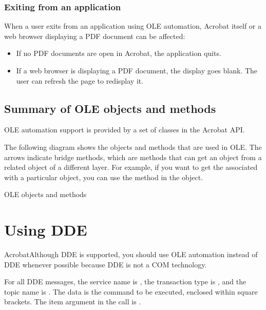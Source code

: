 \documentclass[letterpaper,12pt,english,openany,oneside]{sphinxmanual}
\begin{document}
\subsection{Exiting from an application}
\label{\detokenize{IAC_DevApp_OLE_Support:exiting-from-an-application}}
When a user exits from an application using OLE automation, Acrobat itself or a web browser displaying a PDF document can be affected:
\begin{itemize}
\item {} 
If no PDF documents are open in Acrobat, the application quits.

\item {} 
If a web browser is displaying a PDF document, the display goes blank. The user can refresh the page to redisplay it.

\end{itemize}




\section{Summary of OLE objects and methods}
\label{\detokenize{IAC_DevApp_OLE_Support:summary-of-ole-objects-and-methods}}
OLE automation support is provided by a set of classes in the Acrobat API.

The following diagram shows the objects and methods that are used in OLE. The arrows indicate bridge methods, which are methods that can get an object from a related object of a different layer. For example, if you want to get the  associated with a particular  object, you can use the  method in the  object.

OLE objects and methods

\noindent{}


\chapter{Using DDE}
\label{\detokenize{IAC_DevApp_DDE_Support:using-dde}}\label{\detokenize{IAC_DevApp_DDE_Support::doc}}
AcrobatAlthough DDE is supported, you should use OLE automation instead of DDE whenever possible because DDE is not a COM technology.

For all DDE messages, the service name is , the transaction type is , and the topic name is . The data is the command to be executed, enclosed within square brackets. The item argument in the  call is .
\end{document}
